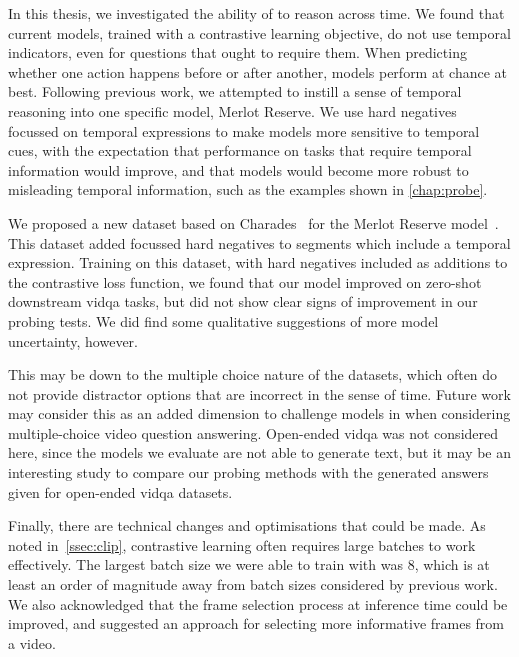 \label{chap:conclusion}

In this thesis, we investigated the ability of  to reason across
time. We found that current models, trained with a contrastive learning
objective, do not use temporal indicators, even for questions that ought to
require them. When predicting whether one action happens before or after
another, models perform at chance at best. Following previous work, we
attempted to instill a sense of temporal reasoning into one specific model,
Merlot Reserve. We use hard negatives focussed on temporal expressions to make
models more sensitive to temporal cues, with the expectation that performance
on tasks that require temporal information would improve, and that models would
become more robust to misleading temporal information, such as the examples
shown in \cref{chap:probe}.

We proposed a new dataset based on Charades~\citep{sigurdsson2016charades} for
the Merlot Reserve model~\citep{zellers2022mreserve}. This dataset added
focussed hard negatives to segments which include a temporal expression.
Training on this dataset, with hard negatives included as additions to the
contrastive loss function, we found that our model improved on zero-shot
downstream \acrshort{vidqa} tasks, but did not show clear signs of improvement
in our probing tests. We did find some qualitative suggestions of more model
uncertainty, however.


This may be down to the multiple choice nature of the datasets,
which often do not provide distractor options that are incorrect in the sense
of time. Future work may consider this as an added dimension to challenge
models in when considering multiple-choice video question answering. Open-ended
\acrshort{vidqa} was not considered here, since the models we evaluate are not
able to generate text, but it may be an interesting study to compare our
probing methods with the generated answers given for open-ended
\acrshort{vidqa} datasets.

Finally, there are technical changes and optimisations that could be made. As
noted in~\cref{ssec:clip}, contrastive learning often requires large batches to
work effectively. The largest batch size we were able to train with was 8,
which is at least an order of magnitude away from batch sizes considered by
previous work. We also acknowledged that the frame selection process at
inference time could be improved, and suggested an approach for selecting more
informative frames from a video. 


